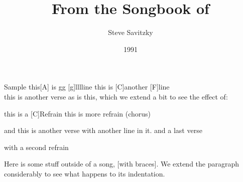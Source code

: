 \title{From the Songbook of}
\author{Steve Savitzky}
\date{1991}





\begin{song}{Sample}
this[A] is gg [g]lllline
this is [C]another [F]line
\\
this is another verse
as is this, which we extend a bit to see the effect of:
\begin{refrain}
  this is a [C]Refrain
  this is more refrain (chorus)
\end{refrain}
and this is another verse
with another line in it.
and a last verse
\begin{refrain}
 with a second refrain
\end{refrain}
\end{song}


Here is some stuff outside of a song, [with braces].  We extend the
paragraph considerably to see what happens to its indentation.

